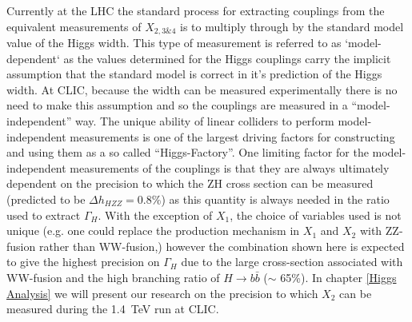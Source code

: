 Currently at the LHC the standard process for extracting couplings from the equivalent measurements of $X_{2,3\&4}$ is to multiply through by the standard model value of the Higgs width. This type of measurement is referred to as `model-dependent` as the values determined for the Higgs couplings carry the implicit assumption that the standard model is correct in it's prediction of the Higgs width. At CLIC, because the width can be measured experimentally there is no need to make this assumption and so the couplings are measured in a ``model-independent'' way. The unique ability of linear colliders to perform model-independent measurements is one of the largest driving factors for constructing and using them as a so called ``Higgs-Factory''. One limiting factor for the model-independent measurements of the couplings is that they are always ultimately dependent on the precision to which the ZH cross section can be measured (predicted to be $\Delta h_{HZZ} = 0.8\%$) as this quantity is always needed in the ratio used to extract $\Gamma_H$. With the exception of $X_1$, the choice of variables used is not unique (e.g. one could replace the production mechanism in $X_1$ and $X_2$ with ZZ-fusion rather than WW-fusion,) however the combination shown here is expected to give the highest precision on $\Gamma_H$ due to the large cross-section associated with WW-fusion and the high branching ratio of $H\rightarrow b\bar{b}$ ($\sim$ 65\%). In chapter \ref{Higgs Analysis} we will present our research on the precision to which $X_2$ can be measured during the 1.4~TeV run at CLIC.

